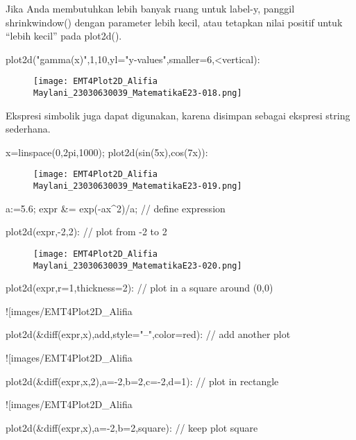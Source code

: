 \documentclass{article}
\begin{document}
Jika Anda membutuhkan lebih banyak ruang untuk label-y, panggil
shrinkwindow() dengan parameter lebih kecil, atau tetapkan nilai
positif untuk “lebih kecil” pada plot2d().


\>plot2d("gamma(x)",1,10,yl="y-values",smaller=6,<vertical):


\begin{figure}
    \centering
    \texttt{[image: EMT4Plot2D\_Alifia Maylani\_23030630039\_MatematikaE23-018.png]}
    \caption{}
    \label{fig:enter-label}
\end{figure}

Ekspresi simbolik juga dapat digunakan, karena disimpan sebagai
ekspresi string sederhana.


\>x=linspace(0,2pi,1000); plot2d(sin(5x),cos(7x)):


\begin{figure}
    \centering
    \texttt{[image: EMT4Plot2D\_Alifia Maylani\_23030630039\_MatematikaE23-019.png]}
    \caption{}
    \label{fig:enter-label}
\end{figure}

\>a:=5.6; expr &= exp(-a\*x^2)/a; // define expression

\>plot2d(expr,-2,2): // plot from -2 to 2


\begin{figure}
    \centering
    \texttt{[image: EMT4Plot2D\_Alifia Maylani\_23030630039\_MatematikaE23-020.png]}
    \caption{}
    \label{fig:enter-label}
\end{figure}

\>plot2d(expr,r=1,thickness=2): // plot in a square around (0,0)


![images/EMT4Plot2D_Alifia%

\>plot2d(&diff(expr,x),\>add,style="--",color=red): // add another plot


![images/EMT4Plot2D_Alifia%

\>plot2d(&diff(expr,x,2),a=-2,b=2,c=-2,d=1): // plot in rectangle


![images/EMT4Plot2D_Alifia%

\>plot2d(&diff(expr,x),a=-2,b=2,\>square): // keep plot square
\end{document}
